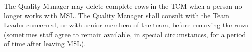 The Quality Manager may delete complete rows in the TCM when a person no longer works with MSL. The Quality Manager shall consult with the Team Leader concerned, or with senior members of the team, before removing the rows (sometimes staff agree to remain available, in special circumstances, for a period of time after leaving MSL).
